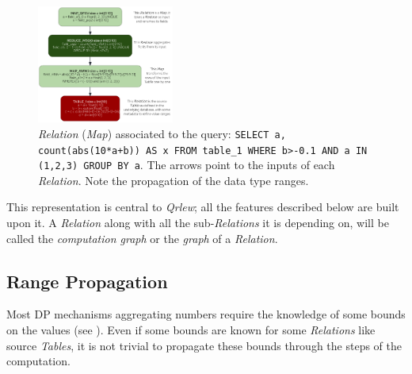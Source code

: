 \documentclass[letterpaper]{article} %
\newcommand{\qrlew}{\emph{Qrlew}}
\begin{document}
\begin{figure}[t]
    \centering
    \includegraphics[width=0.4\textwidth]{figures/relation}
    \caption{\emph{Relation} (\emph{Map}) associated to the query: \texttt{SELECT a, count(abs(10*a+b)) AS x FROM table\_1 WHERE b>-0.1 AND a IN (1,2,3) GROUP BY a}. The arrows point to the inputs of each \emph{Relation}. Note the propagation of the data type ranges.}
    \label{process}
\end{figure}

This representation is central to \qrlew{}; all the features described below are built upon it. A \emph{Relation} along with all the  sub-\emph{Relations} it is depending on, will be called the \emph{computation graph} or the \emph{graph} of a \emph{Relation}.

\subsection{Range Propagation}
\label{sec:range_propagation}

Most DP mechanisms aggregating numbers require the knowledge of some bounds on the values (see \cite{dwork2014algorithmic}).
Even if some bounds are known for some \emph{Relations} like source \emph{Tables}, it is not trivial to propagate these bounds through the steps of the computation.
\end{document}
